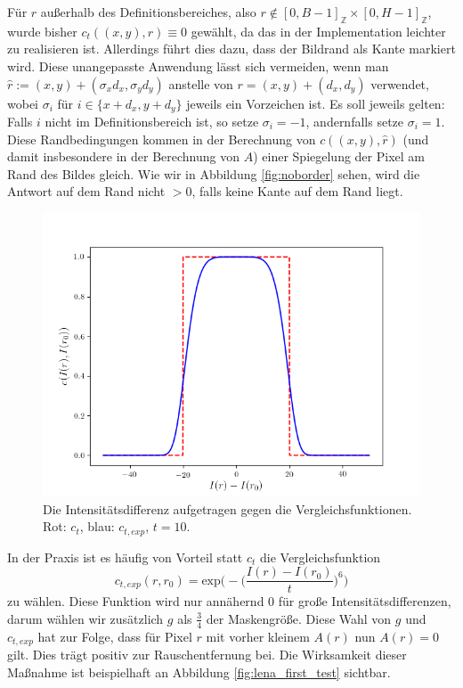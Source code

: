 \documentclass[a4paper, 11pt]{report}
\theoremstyle{definition}
\begin{document}
			Für $r$ außerhalb des Definitionsbereiches, also $r \notin [0, B-1]_\mathbb{Z} \times [0, H-1]_\mathbb{Z}$, wurde bisher $c_t((x,y),r) \equiv 0$ gewählt, da das in der Implementation leichter zu realisieren ist. Allerdings führt dies dazu, dass der Bildrand als Kante markiert wird. Diese unangepasste Anwendung lässt sich vermeiden, wenn man $\hat r := (x,y) + (\sigma_x d_x, \sigma_y d_y)$ anstelle von $r = (x,y) + (d_x, d_y)$ verwendet, wobei $\sigma_i$ für $i \in \{x+d_x,y+d_y\}$ jeweils ein Vorzeichen ist.
			Es soll jeweils gelten: Falls $i$ nicht im Definitionsbereich ist, so setze $\sigma_i = -1$, andernfalls setze $\sigma_i = 1$.
			Diese Randbedingungen kommen in der Berechnung von $c((x,y), \hat r)$ (und damit insbesondere in der Berechnung von $A$) einer Spiegelung der Pixel am Rand des Bildes gleich. Wie wir in Abbildung \ref{fig:noborder} sehen, wird die Antwort auf dem Rand nicht $> 0$, falls keine Kante auf dem Rand liegt.

			\begin{figure}[H]\centering
				\includegraphics[width=.55\textwidth]{./py/cexp.png}
				\caption{Die Intensitätsdifferenz aufgetragen gegen die Vergleichsfunktionen. Rot: $c_t$, blau: $c_{t,exp}$, $t = 10$.}
			\end{figure}

			In der Praxis ist es häufig von Vorteil statt $c_t$ die Vergleichsfunktion
			$$
				c_{t, exp}(r, r_0) =
					\text{exp}\bigg(-\Big(\frac{I(r) - I(r_0)}{t}\Big)^6\bigg)
			$$
			zu wählen.
			Diese Funktion wird nur annähernd $0$ für große Intensitätsdifferenzen, darum wählen wir zusätzlich $g$ als $\frac{3}{4}$ der Maskengröße. Diese Wahl von $g$ und $c_{t,exp}$ hat zur Folge, dass für Pixel $r$ mit vorher kleinem $A(r)$ nun $A(r) = 0$ gilt. Dies trägt positiv zur Rauschentfernung bei. Die Wirksamkeit dieser Maßnahme ist beispielhaft an Abbildung \ref{fig:lena_first_test} sichtbar.
\end{document}
